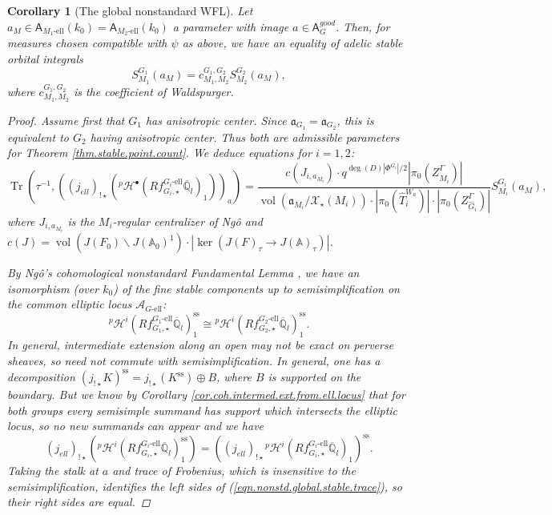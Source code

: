 \documentclass[openany]{amsbook}
\newtheorem{corollary}[theorem]{Corollary}
\theoremstyle{definition}
\theoremstyle{remark}
\numberwithin{equation}{section}
\newcommand{\Q}{\mathbb{Q}}
\newcommand{\cA}{\mathcal{A}}
\newcommand{\cX}{\mathcal{X}}
\newcommand{\A}{\mathbb{A}}
\newcommand{\ol}[1]{\overline{#1}}
\newcommand{\Tr}{\operatorname{Tr }}
\newcommand{\vol}{\operatorname{vol}}
\renewcommand{\-}{\operatorname{-}}
\renewcommand{\a}{\mathfrak{a}}
\newcommand{\pHi}{{}^p \mathcal{H}^i}
\newcommand{\pH}{{}^p \mathcal{H}}
\newcommand{\good}{\mathit{good}}
\renewcommand{\A}{\mathbb{A}}
\newcommand{\el}{\text{-ell}}
\newcommand{\bA}{\mathsf{A}}
\renewcommand{\ss}{\mathrm{ss}}
\begin{document}
\begin{corollary}[The global nonstandard WFL]\label{cor.global.nonstd.WFL}
    Let $a_M \in \bA_{M_1\el}(k_0) = \bA_{M_2\el}(k_0)$ a parameter with image $a \in \bA_G^{\good}$. Then, for measures chosen compatible with $\psi$ as above, we have an equality of adelic stable orbital integrals 
    $$
        S_{M_1}^{G_1}(a_M) = c_{M_1, M_2}^{G_1, G_2} S_{M_2}^{G_2}(a_M),
    $$
    where $c_{M_1, M_2}^{G_1, G_2}$ is the coefficient of Waldspurger.
    \begin{proof}
        Assume first that $G_1$ has anisotropic center. Since $\a_{G_1} = \a_{G_2}$, this is equivalent to $G_2$ having anisotropic center. Thus both are admissible parameters for Theorem \ref{thm.stable.point.count}. 
        We deduce equations for $i = 1,2$:
        \begin{equation}
            \Tr(\tau^{-1}, ((j_{ell})_{!\star}(\pH^\bullet(Rf_{G_i,\star}^{G_i\el} \ol{\Q}_l)_1))_a) = \frac{c(J_{i, a_{M_i}}) \cdot q^{\deg(D) |\Phi^{G_i}|/2} |\pi_0(Z^\Gamma_{\widehat{M}_i})|}{\vol(\a_{M_i}/\cX_\star(M_i)) \cdot |\pi_0(\widehat{T}_i^{W_a})| \cdot |\pi_0(Z^\Gamma_{\widehat{G}_i})|} S_{M_i}^{G_i}(a_M),\label{eqn.nonstd.global.stable.trace}
        \end{equation}
        where $J_{i, a_{M_i}}$ is the $M_i$-regular centralizer of Ng\^{o} and $c(J) = \vol(J(F_0) \backslash J(\A_0)^1)\cdot  |\ker(J(F)_{\tau} \to J(\A)_{\tau})|$.
        
        By Ng\^{o}'s cohomological nonstandard Fundamental Lemma \cite[Th\'eor\`eme 8.8.2]{ngofl}, we have an isomorphism (over $k_0$) of the fine stable components up to semisimplification on the common elliptic locus $\cA_{G\el}$:
        $$
            \pHi(Rf_{G_1,\star}^{G_1\el} \ol{\Q}_l)_1^{\ss} \cong \pHi(Rf_{G_2,\star}^{G_2\el} \ol{\Q}_l)^{\ss}_1.
        $$
        In general, intermediate extension along an open may not be exact on perverse sheaves, so need not commute with semisimplification. In general, one has a decomposition $(j_{!\star} K)^{\ss} = j_{!\star}(K^{\ss}) \oplus B$, where $B$ is supported on the boundary. But we know by Corollary \ref{cor.coh.intermed.ext.from.ell.locus} that for both groups every semisimple summand has support which intersects the elliptic locus, so no new summands can appear and we have 
        $$
            (j_{ell})_{!\star} \left(\pHi(Rf_{G_i,\star}^{G_i\el} \ol{\Q}_l)_1^{\ss}\right) = \left((j_{ell})_{!\star} \pHi(Rf_{G_i,\star}^{G_i\el} \ol{\Q}_l)_1\right)^{\ss}.
        $$
        Taking the stalk at $a$ and trace of Frobenius, which is insensitive to the semisimplification, identifies the left sides of (\ref{eqn.nonstd.global.stable.trace}), so their right sides are equal. 
        

\end{proof}
\end{corollary}
\end{document}
